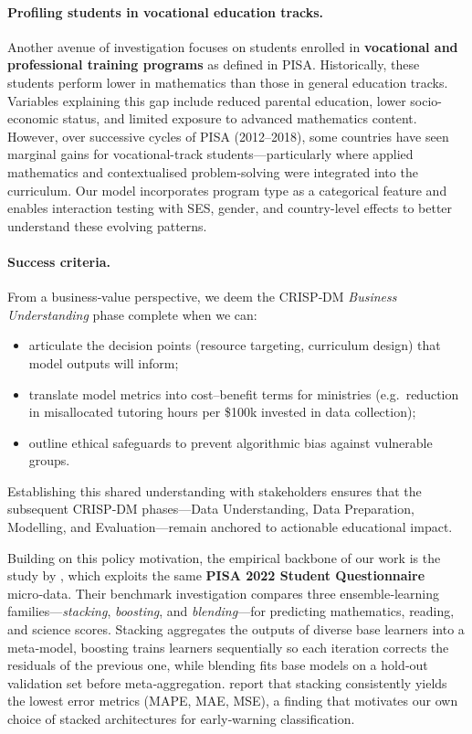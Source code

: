 \documentclass[final,5p,times,twocolumn,authoryear]{elsarticle}
\begin{document}
\paragraph{Profiling students in vocational education tracks.}
Another avenue of investigation focuses on students enrolled in \textbf{vocational and professional training programs} as defined in PISA. Historically, these students perform lower in mathematics than those in general education tracks. Variables explaining this gap include reduced parental education, lower socio-economic status, and limited exposure to advanced mathematics content. However, over successive cycles of PISA (2012–2018), some countries have seen marginal gains for vocational-track students—particularly where applied mathematics and contextualised problem-solving were integrated into the curriculum. Our model incorporates program type as a categorical feature and enables interaction testing with SES, gender, and country-level effects to better understand these evolving patterns.


\paragraph{Success criteria.}
From a business‑value perspective, we deem the CRISP‑DM \emph{Business Understanding} phase complete when we can:

\begin{itemize}
  \item articulate the decision points (resource targeting, curriculum design) that model outputs will inform;
  \item translate model metrics into cost–benefit terms for ministries (e.g.\ reduction in misallocated tutoring hours per \$100k invested in data collection);
  \item outline ethical safeguards to prevent algorithmic bias against vulnerable groups.
\end{itemize}

Establishing this shared understanding with stakeholders ensures that the subsequent CRISP‑DM phases—Data Understanding, Data Preparation, Modelling, and Evaluation—remain anchored to actionable educational impact.


Building on this policy motivation, the empirical backbone of our work is the study by \cite{Stacking}, which exploits the same \textbf{PISA 2022 Student Questionnaire} micro‑data.  Their benchmark investigation compares three ensemble‑learning families—\emph{stacking}, \emph{boosting}, and \emph{blending}—for predicting mathematics, reading, and science scores.  Stacking aggregates the outputs of diverse base learners into a meta‑model, boosting trains learners sequentially so each iteration corrects the residuals of the previous one, while blending fits base models on a hold‑out validation set before meta‑aggregation.  \citeauthor{Stacking} report that stacking consistently yields the lowest error metrics (MAPE, MAE, MSE), a finding that motivates our own choice of stacked architectures for early‑warning classification.
\end{document}
